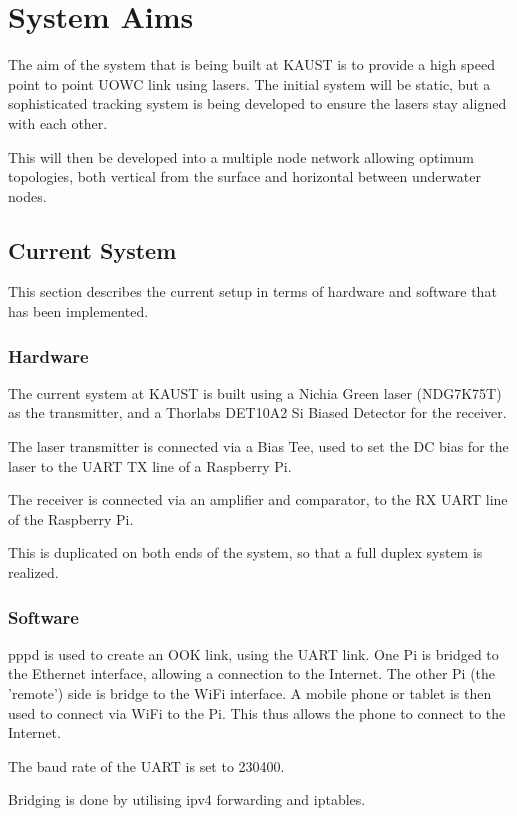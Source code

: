 \section{System Aims}
The aim of the system that is being built at \ac{KAUST} is to provide a high
speed point to point \ac{UOWC} link using lasers. The initial system will be
static, but a sophisticated tracking system is being developed to ensure the
lasers stay aligned with each other.

This will then be developed into a multiple node network allowing optimum
topologies, both vertical from the surface and horizontal between underwater
nodes.

\subsection{Current System}
This section describes the current setup in terms of hardware and software
that has been implemented.

\subsubsection{Hardware}
The current system at \ac{KAUST} is built using a Nichia Green laser (NDG7K75T)
as the transmitter, and a Thorlabs DET10A2 Si Biased Detector for the receiver.

The laser transmitter is connected via a Bias Tee, used to set the DC bias
for the laser to the \ac{UART} TX line of a Raspberry Pi.

The receiver is connected via an amplifier and comparator, to the RX UART
line of the Raspberry Pi.

This is duplicated on both ends of the system, so that a full duplex
system is realized.

\subsubsection{Software}
pppd is used to create an OOK link, using the \ac{UART} link. One Pi is
bridged to the Ethernet interface, allowing a connection to the Internet.
The other Pi (the 'remote') side is bridge to the WiFi interface. A mobile
phone or tablet is then used to connect via WiFi to the Pi. This thus allows
the phone to connect to the Internet.

The baud rate of the \ac{UART} is set to 230400.

Bridging is done by utilising ipv4 forwarding and iptables.

